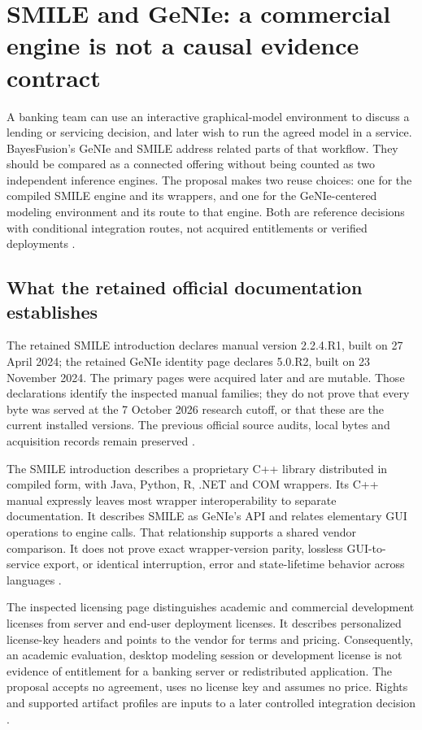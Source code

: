 \section{SMILE and GeNIe: a commercial engine is not a causal evidence contract}
\label{sec:exec24-smile-reuse}

A banking team can use an interactive graphical-model environment to discuss
a lending or servicing decision, and later wish to run the agreed model in
a service. BayesFusion's GeNIe and SMILE address related parts of that
workflow. They should be compared as a connected offering without being
counted as two independent inference engines. The proposal makes two reuse
choices: one for the compiled SMILE engine and its wrappers, and one for the
GeNIe-centered modeling environment and its route to that engine. Both are
reference decisions with conditional integration routes, not acquired
entitlements or verified deployments \cite{exec13_smile_intro,
exec13_smile_license,exec24_smile_choice}.

\subsection{What the retained official documentation establishes}
The retained SMILE introduction declares manual version 2.2.4.R1, built on
27 April 2024; the retained GeNIe identity page declares 5.0.R2, built on
23 November 2024. The primary pages were acquired later and are mutable.
Those declarations identify the inspected manual families; they do not
prove that every byte was served at the 7 October 2026 research cutoff,
or that these are the current installed versions. The previous official
source audits, local bytes and acquisition records remain preserved
\cite{exec13_smile_intro,exec13_genie_readme,exec24_smile_choice}.

The SMILE introduction describes a proprietary C++ library distributed in
compiled form, with Java, Python, R, .NET and COM wrappers. Its C++ manual
expressly leaves most wrapper interoperability to separate documentation.
It describes SMILE as GeNIe's API and relates elementary GUI operations to
engine calls. That relationship supports a shared vendor comparison. It
does not prove exact wrapper-version parity, lossless GUI-to-service export,
or identical interruption, error and state-lifetime behavior across languages
\cite{exec13_smile_intro}.

The inspected licensing page distinguishes academic and commercial
development licenses from server and end-user deployment licenses. It
describes personalized license-key headers and points to the vendor for
terms and pricing. Consequently, an academic evaluation, desktop modeling
session or development license is not evidence of entitlement for a banking
server or redistributed application. The proposal accepts no agreement,
uses no license key and assumes no price. Rights and supported artifact
profiles are inputs to a later controlled integration decision
\cite{exec13_smile_license,exec24_smile_choice}.

